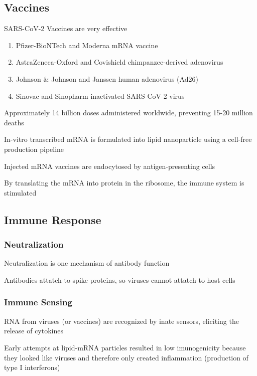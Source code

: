 \documentclass{notes}
\begin{document}
\subsection{Vaccines}

SARS-CoV-2 Vaccines are very effective

\begin{enumerate}
    \item Pfizer-BioNTech and Moderna mRNA vaccine
    \item AstraZeneca-Oxford and Covishield chimpanzee-derived adenovirus
    \item Johnson \& Johnson and Janssen human adenovirus (Ad26)
    \item Sinovac and Sinopharm inactivated SARS-CoV-2 virus
\end{enumerate}

Approximately 14 billion doses administered worldwide, preventing 15-20 million deaths

In-vitro transcribed mRNA is formulated into lipid nanoparticle using a cell-free production pipeline


Injected mRNA vaccines are endocytosed by antigen-presenting cells

\tab \indicates By translating the mRNA into protein in the ribosome, the immune system is stimulated

\subsection{Immune Response}

\subsubsection{Neutralization}

Neutralization is one mechanism of antibody function

\tab \indicates Antibodies attatch to spike proteins, so viruses cannot attatch to host cells

\subsubsection{Immune Sensing}

RNA from viruses (or vaccines) are recognized by inate sensors, eliciting the release of cytokines

Early attempts at lipid-mRNA particles resulted in low imunogenicity because they looked like viruses and therefore only created inflammation (production of type I interferons)
\end{document}
